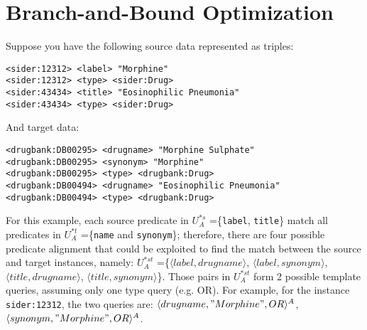 \section{Branch-and-Bound Optimization}


Suppose you have the following source data represented as triples:
\begin{lstlisting}[basicstyle=\LSTfont]
<sider:12312> <label> "Morphine"
<sider:12312> <type> <sider:Drug>
<sider:43434> <title> "Eosinophilic Pneumonia"
<sider:43434> <type> <sider:Drug>
\end{lstlisting}
And target data: 
\begin{lstlisting}[basicstyle=\LSTfont]
<drugbank:DB00295> <drugname> "Morphine Sulphate"
<drugbank:DB00295> <synonym> "Morphine"
<drugbank:DB00295> <type> <drugbank:Drug>
<drugbank:DB00494> <drugname> "Eosinophilic Pneumonia"
<drugbank:DB00494> <type> <drugbank:Drug>
\end{lstlisting}

For this example, each source predicate in $U^{*s}_A$ =\{\verb+label+, \verb+title+\} match all predicates in $U^{*t}_A$ =\{\verb+name+ and \verb+synonym+\}; therefore, there are four possible predicate alignment that could be exploited to find the match between the source and target instances, namely: $U^{*st}_A$ =\{$\langle label,drugname \rangle$, $\langle label,synonym \rangle$,$\langle title,drugname \rangle$, $\langle title,synonym \rangle$\}. Those pairs in  $U^{*st}_A$ form 2 possible template queries, assuming  only one type query (e.g. OR). For example, for the instance \verb+sider:12312+, the two queries are:
$\langle drugname,"Morphine", OR \rangle^A$, 
$\langle synonym,"Morphine", OR \rangle^A$.
 
